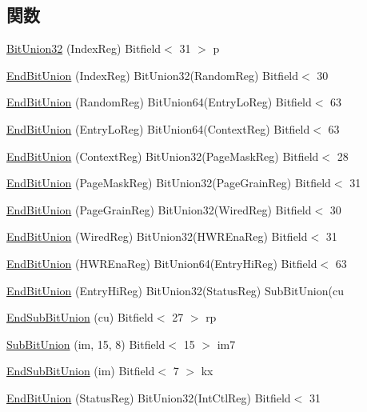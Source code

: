 \subsection*{関数}
\begin{DoxyCompactItemize}
\item 
\hyperlink{namespaceMipsISA_a5318fa590b967d1cce26803bf9539c46}{BitUnion32} (IndexReg) Bitfield$<$ 31 $>$ p
\item 
\hyperlink{namespaceMipsISA_acdac2835e979782dfb5f4dedb07cebf6}{EndBitUnion} (IndexReg) BitUnion32(RandomReg) Bitfield$<$ 30
\item 
\hyperlink{namespaceMipsISA_a08a917e4a5520bc6b8708a50d79fc5e3}{EndBitUnion} (RandomReg) BitUnion64(EntryLoReg) Bitfield$<$ 63
\item 
\hyperlink{namespaceMipsISA_a2f83cac203226d978f94ceadc0f1fd88}{EndBitUnion} (EntryLoReg) BitUnion64(ContextReg) Bitfield$<$ 63
\item 
\hyperlink{namespaceMipsISA_affe34aeb9561de969472b55e2b0d5e0d}{EndBitUnion} (ContextReg) BitUnion32(PageMaskReg) Bitfield$<$ 28
\item 
\hyperlink{namespaceMipsISA_ab98e8b6b2a57e34bb361953a3b7f2000}{EndBitUnion} (PageMaskReg) BitUnion32(PageGrainReg) Bitfield$<$ 31
\item 
\hyperlink{namespaceMipsISA_ac14ccf4312f06938b6a25b4c6d1007be}{EndBitUnion} (PageGrainReg) BitUnion32(WiredReg) Bitfield$<$ 30
\item 
\hyperlink{namespaceMipsISA_ae6ae1f832215eb212edd341da19bfd74}{EndBitUnion} (WiredReg) BitUnion32(HWREnaReg) Bitfield$<$ 31
\item 
\hyperlink{namespaceMipsISA_adb415f6d2fa6029a6566a4bfcdb28cd4}{EndBitUnion} (HWREnaReg) BitUnion64(EntryHiReg) Bitfield$<$ 63
\item 
\hyperlink{namespaceMipsISA_a38f6c3f5c682d3b02ede775e3bff960f}{EndBitUnion} (EntryHiReg) BitUnion32(StatusReg) SubBitUnion(cu
\item 
\hyperlink{namespaceMipsISA_ab60686612b9e6fa8a4e99524f00655e0}{EndSubBitUnion} (cu) Bitfield$<$ 27 $>$ rp
\item 
\hyperlink{namespaceMipsISA_ab47da88f01b42dd221472b82e3ad0509}{SubBitUnion} (im, 15, 8) Bitfield$<$ 15 $>$ im7
\item 
\hyperlink{namespaceMipsISA_ac2fda487f43a314ab9a0da3bf8de9fb8}{EndSubBitUnion} (im) Bitfield$<$ 7 $>$ kx
\item 
\hyperlink{namespaceMipsISA_a2c66e89106e52623e57049523e1c9d6e}{EndBitUnion} (StatusReg) BitUnion32(IntCtlReg) Bitfield$<$ 31
\item 

\end{DoxyCompactItemize}
